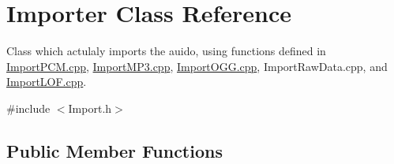\hypertarget{class_importer}{}\section{Importer Class Reference}
\label{class_importer}


Class which actulaly imports the auido, using functions defined in \hyperlink{_import_p_c_m_8cpp}{Import\+P\+C\+M.\+cpp}, \hyperlink{_import_m_p3_8cpp}{Import\+M\+P3.\+cpp}, \hyperlink{_import_o_g_g_8cpp}{Import\+O\+G\+G.\+cpp}, Import\+Raw\+Data.\+cpp, and \hyperlink{_import_l_o_f_8cpp}{Import\+L\+O\+F.\+cpp}.  




{\ttfamily \#include $<$Import.\+h$>$}

\subsection*{Public Member Functions}
